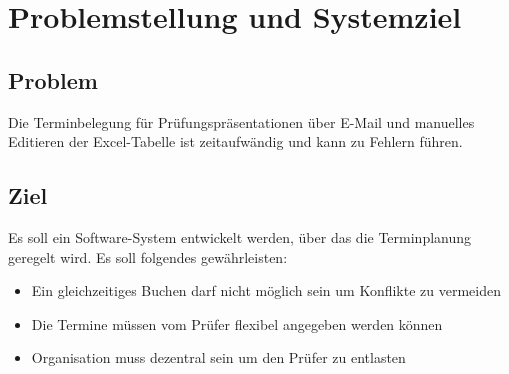 \section{Problemstellung und Systemziel}

\subsection{Problem}
Die Terminbelegung für Prüfungspräsentationen über E-Mail und manuelles
Editieren der Excel-Tabelle ist zeitaufwändig und kann zu Fehlern
führen.

\subsection{Ziel}
Es soll ein Software-System entwickelt werden, über das die
Terminplanung geregelt wird. Es soll folgendes gewährleisten:
\begin{itemize}
  \item Ein gleichzeitiges Buchen darf nicht möglich sein um Konflikte zu vermeiden
  \item Die Termine müssen vom Prüfer flexibel angegeben werden können
  \item Organisation muss dezentral sein um den Prüfer zu entlasten
\end{itemize}
